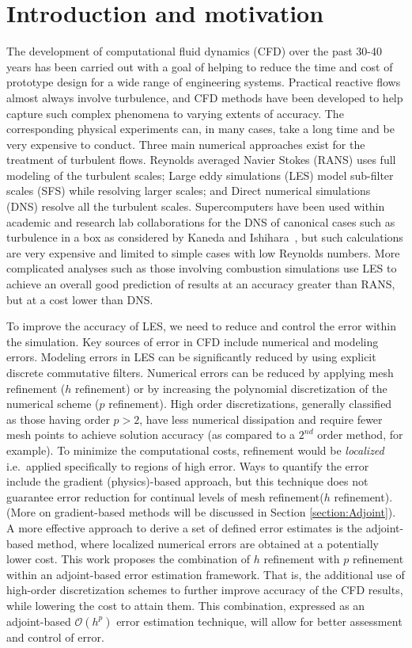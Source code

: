 \section{Introduction and motivation}

The development of computational fluid dynamics (CFD) over the past 30-40 years has been carried out with a goal of helping to reduce the time and cost of prototype design for a wide range of engineering systems. Practical reactive flows almost always involve turbulence, and CFD methods have been developed to help capture such complex phenomena to varying extents of accuracy. The corresponding physical experiments can, in many cases, take a long time and be very expensive to conduct. Three main numerical approaches exist for the treatment of turbulent flows. Reynolds averaged Navier Stokes (RANS) uses full modeling of the turbulent scales; Large eddy simulations (LES) model sub-filter scales (SFS) while resolving larger scales; and Direct numerical simulations (DNS) resolve all the turbulent scales. Supercomputers have been used within academic and research lab collaborations for the DNS of canonical cases such as turbulence in a box as considered by Kaneda and Ishihara~\cite{kaneda:2006}, but such calculations are very expensive and limited to simple cases with low Reynolds numbers. More complicated analyses such as those involving combustion simulations use LES to achieve an overall good prediction of results at an accuracy greater than RANS, but at a cost lower than DNS.\par 

To improve the accuracy of LES, we need to reduce and control the error within the simulation. Key sources of error in CFD include numerical and modeling errors. Modeling errors in LES can be significantly reduced by using explicit discrete commutative filters. Numerical errors can be reduced by applying mesh refinement ($h$ refinement) or by increasing the polynomial discretization of the numerical scheme ($p$ refinement). High order discretizations, generally classified as those having order $p>2$, have less numerical dissipation and require fewer mesh points to achieve solution accuracy (as compared to a $2^{nd}$ order method, for example). To minimize the computational costs, refinement would be \textit{localized} i.e.\ applied specifically to regions of high error. Ways to quantify the error include the gradient (physics)-based approach, but this technique does not guarantee error reduction for continual levels of mesh refinement($h$ refinement).  (More on gradient-based methods will be discussed in Section \ref{section:Adjoint}). A more effective approach to derive a set of defined error estimates is the adjoint-based method, where localized numerical errors are obtained at a potentially lower cost. This work proposes the combination of $h$ refinement with $p$ refinement within an adjoint-based error estimation framework. That is, the additional use of high-order discretization schemes  to further improve accuracy of the CFD results, while lowering the cost to attain them. This combination, expressed as an adjoint-based $\mathcal{O}(h^p)$ error estimation technique, will allow for better assessment and control of error.\par 